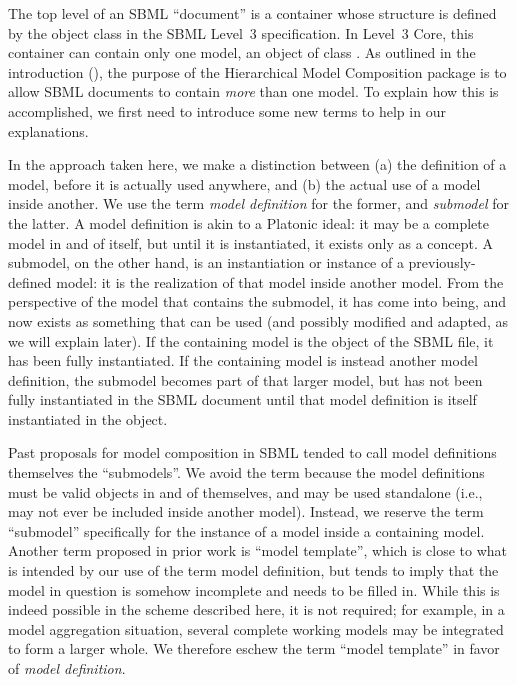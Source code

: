 The top level of an SBML ``document'' is a container whose structure is
defined by the object class \SBML in the SBML Level~3 specification.  In
Level~3 Core, this container can contain only one model, an object of
class \Model.  As outlined in the introduction (), the
purpose of the Hierarchical Model Composition package is to allow SBML
documents to contain \emph{more} than one model.  To explain how this is
accomplished, we first need to introduce some new terms to help in our
explanations.

In the approach taken here, we make a distinction between (a) the
definition of a model, before it is actually used anywhere, and (b) the
actual use of a model inside another.  We use the term \emph{model
  definition} for the former, and \emph{submodel} for the latter.  A
model definition is akin to a Platonic ideal: it may be a complete model
in and of itself, but until it is instantiated, it exists only as a
concept.  A submodel, on the other hand, is an instantiation or instance
of a previously-defined model: it is the realization of that model
inside another model.  From the perspective of the model that contains
the submodel, it has come into being, and now exists as something that
can be used (and possibly modified and adapted, as we will explain
later).  If the containing model is the \Model object of the SBML file,
it has been fully instantiated.  If the containing model is instead
another model definition, the submodel becomes part of that larger
model, but has not been fully instantiated in the SBML document until
that model definition is itself instantiated in the \Model object.

Past proposals for model composition in SBML tended to call model
definitions themselves the ``submodels''.  We avoid the term because the
model definitions must be valid \Model objects in and of themselves, and
may be used standalone (i.e., may not ever be included inside another
model).  Instead, we reserve the term ``submodel'' specifically for the
instance of a model inside a containing model.  Another term proposed in
prior work is ``model template'', which is close to what is intended by
our use of the term model definition, but tends to imply that the model
in question is somehow incomplete and needs to be filled in.  While this
is indeed possible in the scheme described here, it is not required; for
example, in a model aggregation situation, several complete working
models may be integrated to form a larger whole.  We therefore eschew
the term ``model template'' in favor of \emph{model definition}.

